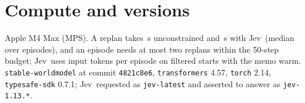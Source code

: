 \documentclass[11pt]{article}
\newcommand{\jev}{Jev}
\begin{document}
\section{Compute and versions}
Apple M4 Max (MPS). A replan takes \,s unconstrained and \,s with \jev\ (median over episodes), and an episode needs at most two replans within the 50-step budget; \jev\ uses  input tokens per episode on filtered starts with the memo warm. \texttt{stable-worldmodel} at commit \texttt{4821c8e6}, \texttt{transformers} 4.57, \texttt{torch} 2.14, \texttt{typesafe-sdk} 0.7.1; \jev\ requested as \texttt{jev-latest} and asserted to answer as \texttt{jev-1.13.*}.
\end{document}

